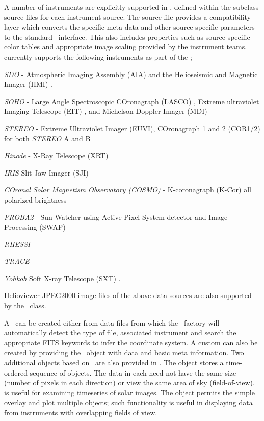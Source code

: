 A number of instruments are explicitly supported in \sunpypkg, defined within the subclass source files for each instrument source. 
The source file provides a compatibility layer which converts the specific meta data and other source-specific parameters to the standard \GenericMap\ interface. 
This also includes properties such as source-specific color tables and appropriate image scaling provided by the instrument teams. 
\sunpypkg currently supports the following instruments as part of the \GenericMap;
\begin{inparaitem}
\item \textit{SDO} - Atmospheric Imaging Assembly (AIA) \citep{lemen2011atmospheric} and the Helioseismic and Magnetic Imager (HMI) \citep{scherrer2012helioseismic}. 
\item \textit{SOHO} - Large Angle Spectroscopic COronagraph (LASCO) \citep{brueckner1995large}, Extreme ultraviolet Imaging Telescope (EIT) \citep{delaboudiniere1995eit}, and Michelson Doppler Imager (MDI) \citep{scherrer1995solar}
\item \textit{STEREO} - Extreme Ultraviolet Imager (EUVI), COronagraph 1 and 2 (COR1/2) for both \textit{STEREO} A and B \citep{howard2008sun}
\item \textit{Hinode} - X-Ray Telescope (XRT) \citep{golub2008x}
\item \textit{IRIS} Slit Jaw Imager (SJI) \citep{DePontieu2014}
\item \textit{COronal Solar Magnetism Observatory (COSMO)} -  K-coronagraph (K-Cor) all polarized brightness
\item \textit{PROBA2} - Sun Watcher using Active Pixel System detector and Image Processing (SWAP) \citep{seaton2013swap}
\item \textit{RHESSI} \citep{lin2002reuven}
\item \textit{TRACE}
\item \textit{Yohkoh} Soft X-ray Telescope (SXT) \citep{tsuneta1991soft}.
\end{inparaitem}
Helioviewer JPEG2000 image files of the above data sources are also supported by the \Map\ class.

A \sunpy \Map\ can be created either from data files from which the \Map\ factory will automatically detect the type of file, associated instrument and search the appropriate FITS keywords to infer the coordinate system. A custom \GenericMap can also be created by providing the \Map\ object with data and basic meta information.
Two additional objects based on \Map\ are also provided in \sunpy. 
The  object stores a time-ordered sequence of \Map objects.  
The data in each \Map need not have the same size (number of pixels in each direction) or view the same area of sky (field-of-view).  is useful for examining timeseries of solar images.  
The  object permits the simple overlay and plot multiple \Map objects; such functionality is useful in displaying data from instruments with overlapping fields of view.



